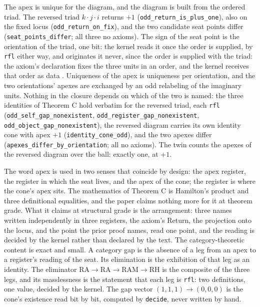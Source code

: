 \documentclass[10pt]{article}
\begin{document}
The apex is unique for the diagram, and the diagram is built from the
ordered triad. The reversed triad \(k \cdot j \cdot i\) returns \(+1\)
(\texttt{odd\_\allowbreak return\_\allowbreak is\_\allowbreak plus\_\allowbreak one}),
also on the fixed locus
(\texttt{odd\_\allowbreak return\_\allowbreak on\_\allowbreak fix}), and
the two candidate seat points differ
(\texttt{seat\_\allowbreak points\_\allowbreak differ}; all three no
axioms). The sign of the seat point is the orientation of the triad, one
bit: the kernel reads it once the order is supplied, by \texttt{rfl}
either way, and originates it never, since the order is supplied with
the triad: the axiom's declaration fixes the three units in an order,
and the kernel receives that order as data \cite{islamraf}. Uniqueness
of the apex is uniqueness per orientation, and the two orientations'
apexes are exchanged by an odd relabeling of the imaginary units.
Nothing in the closure depends on which of the two is named: the three
identities of Theorem C hold verbatim for the reversed triad, each
\texttt{rfl}
(\texttt{odd\_\allowbreak self\_\allowbreak gap\_\allowbreak nonexistent},
\texttt{odd\_\allowbreak register\_\allowbreak gap\_\allowbreak nonexistent},
\texttt{odd\_\allowbreak object\_\allowbreak gap\_\allowbreak nonexistent}),
the reversed diagram carries its own identity cone with apex \(+1\)
(\texttt{identity\_\allowbreak cone\_\allowbreak odd}), and the two
apexes differ
(\texttt{apexes\_\allowbreak differ\_\allowbreak by\_\allowbreak orientation};
all no axioms). The twin counts the apexes of the reversed diagram over
the ball: exactly one, at \(+1\).

The word apex is used in two senses that coincide by design: the apex
register, the register in which the seat lives, and the apex of the
cone; the register is where the cone's apex sits. The mathematics of
Theorem C is Hamilton's product and three definitional equalities, and
the paper claims nothing more for it at theorem grade. What it claims at
structural grade is the arrangement: three names written independently
in three registers, the axiom's Return, the projection onto the locus,
and the point the prior proof names, read one point, and the reading is
decided by the kernel rather than declared by the text. The
category-theoretic content is exact and small. A category gap is the
absence of a leg from an apex to a register's reading of the seat. Its
elimination is the exhibition of that leg as an identity. The eliminator
\(\mathrm{RA} \to \mathrm{RA} \to \mathrm{RAM} \to \mathrm{RH}\) is the
composite of the three legs, and its masslessness is the statement that
each leg is \texttt{rfl}: two definitions, one value, decided by the
kernel. The gap vector \((1,1,1) \to (0,0,0)\) is the cone's existence
read bit by bit, computed by \texttt{decide}, never written by hand.
\end{document}
